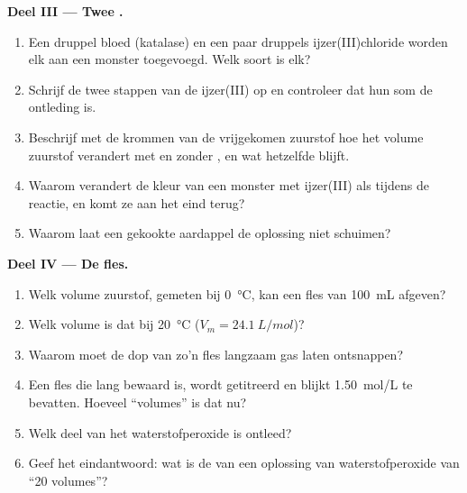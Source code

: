 \begin{problem}
\medskip
\noindent\textbf{Deel III --- Twee .}
\begin{enumerate}[resume]
  \item Een druppel bloed (katalase) en een paar druppels
        ijzer(III)chloride worden elk aan een monster toegevoegd. Welk
        soort  is elk?
  \item Schrijf de twee stappen van de ijzer(III) op en controleer
        dat hun som de ontleding is.
  \item Beschrijf met de krommen van de vrijgekomen zuurstof hoe het
        volume zuurstof verandert met en zonder , en wat
        hetzelfde blijft.
  \item Waarom verandert de kleur van een monster met ijzer(III) als
         tijdens de reactie, en komt ze aan het eind terug?
  \item Waarom laat een gekookte aardappel de oplossing niet schuimen?
\end{enumerate}

\medskip
\noindent\textbf{Deel IV --- De fles.}
\begin{enumerate}[resume]
  \item Welk volume zuurstof, gemeten bij \qty{0}{\celsius}, kan een fles
        van \qty{100}{mL} afgeven?
  \item Welk volume is dat bij \qty{20}{\celsius} ($V_m =
        \qty{24.1}{L/mol}$)?
  \item Waarom moet de dop van zo'n fles langzaam gas laten ontsnappen?
  \item Een fles die lang bewaard is, wordt getitreerd en blijkt
        \qty{1.50}{mol/L} te bevatten. Hoeveel ``volumes'' is dat nu?
  \item Welk deel van het waterstofperoxide is ontleed?
  \item Geef het eindantwoord: wat is de  van een
        oplossing van waterstofperoxide van ``20 volumes''?
\end{enumerate}
\end{problem}
